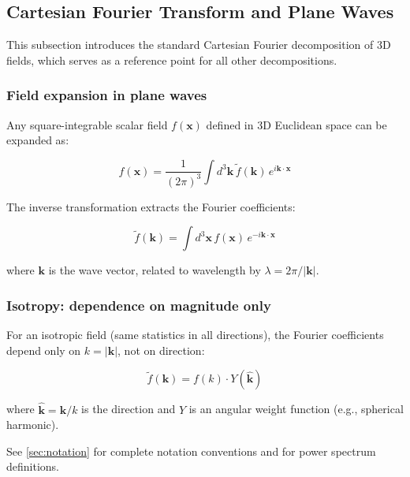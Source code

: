 \subsection{Cartesian Fourier Transform and Plane Waves}\label{subsec:ps_cartesian}

This subsection introduces the standard Cartesian Fourier decomposition of 3D fields, which serves as a reference point for all other decompositions.

\subsubsection{Field expansion in plane waves}

Any square-integrable scalar field $f(\mathbf{x})$ defined in 3D Euclidean space can be expanded as:

\begin{equation}
f(\mathbf{x}) = \frac{1}{(2\pi)^3} \int d^3\mathbf{k} \, \tilde{f}(\mathbf{k}) \, e^{i\mathbf{k} \cdot \mathbf{x}}
\end{equation}

The inverse transformation extracts the Fourier coefficients:

\begin{equation}
\tilde{f}(\mathbf{k}) = \int d^3\mathbf{x} \, f(\mathbf{x}) \, e^{-i\mathbf{k} \cdot \mathbf{x}}
\end{equation}

where $\mathbf{k}$ is the wave vector, related to wavelength by $\lambda = 2\pi / |\mathbf{k}|$.

\subsubsection{Isotropy: dependence on magnitude only}

For an isotropic field (same statistics in all directions), the Fourier coefficients depend only on $k = |\mathbf{k}|$, not on direction:

\begin{equation}
\tilde{f}(\mathbf{k}) = f(k) \cdot Y(\hat{\mathbf{k}})
\end{equation}

where $\hat{\mathbf{k}} = \mathbf{k}/k$ is the direction and $Y$ is an angular weight function (e.g., spherical harmonic).


See \cref{sec:notation} for complete notation conventions and  for power spectrum definitions.
